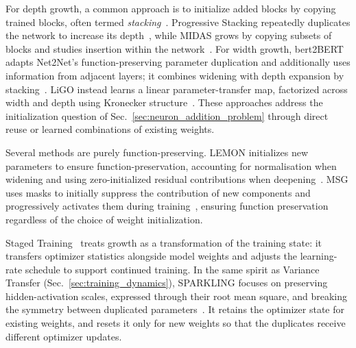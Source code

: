 For depth growth, a common approach is to initialize added blocks by copying trained blocks, often termed \emph{stacking}~\citep{gong_stacking_2019,du_stacking_2024}. Progressive Stacking repeatedly duplicates the network to increase its depth~\citep{gong_stacking_2019}, while MIDAS grows by copying subsets of blocks and studies insertion within the network~\citep{saunshi_inductive_2024}. For width growth, bert2BERT adapts Net2Net's function-preserving parameter duplication and additionally uses information from adjacent layers; it combines widening with depth expansion by stacking~\citep{chen_bert2bert_2022}.
LiGO instead learns a linear parameter-transfer map, factorized across width and depth using Kronecker structure~\citep{wang_ligo_2023}.
These approaches address the initialization question of Sec.~\ref{sec:neuron_addition_problem} through direct reuse or learned combinations of existing weights.

Several methods are purely function-preserving. LEMON initializes new parameters to ensure function-preservation, accounting for normalisation when widening and using zero-initialized residual contributions when deepening~\citep{wang_lemon_2023}.
MSG uses masks to initially suppress the contribution of new components and progressively activates them during training~\citep{yao_msg_2024}, ensuring function preservation regardless of the choice of weight initialization.

Staged Training~\citep{shen_staged_2022} treats growth as a transformation of the training state: it transfers optimizer statistics alongside model weights and adjusts the learning-rate schedule to support continued training. In the same spirit as Variance Transfer (Sec.~\ref{sec:training_dynamics}),
SPARKLING focuses on preserving hidden-activation scales, expressed through their root mean square, and breaking the symmetry between duplicated parameters~\citep{yu_sparkling_2026}.
It retains the optimizer state for existing weights, and resets it only for new weights so that the duplicates receive different optimizer updates.
